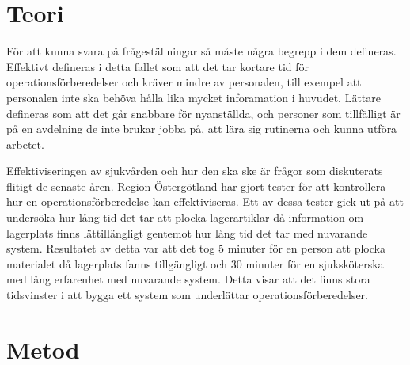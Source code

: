 \documentclass{article}
\begin{document}
\section{Teori}
För att kunna svara på frågeställningar så måste några begrepp i dem defineras.
Effektivt defineras i detta fallet som att det tar kortare tid för operationsförberedelser och kräver mindre av personalen, till exempel att personalen inte ska behöva hålla lika mycket inforamation i huvudet. 
Lättare defineras som att det går snabbare för nyanställda, och personer som tillfälligt är på en avdelning de inte brukar jobba på, att lära sig rutinerna och kunna utföra arbetet.

Effektiviseringen av sjukvården och hur den ska ske är frågor som diskuterats flitigt de senaste åren. Region Östergötland har gjort tester för att kontrollera hur en operationsförberedelse kan effektiviseras. Ett av dessa tester gick ut på att undersöka hur lång tid det tar att plocka lagerartiklar då information om lagerplats finns lättillängligt gentemot hur lång tid det tar med nuvarande system. Resultatet av detta var att det tog 5 minuter för en person att plocka materialet då lagerplats fanns tillgängligt och 30 minuter för en sjuksköterska med lång erfarenhet med nuvarande system. Detta visar att det finns stora tidsvinster i att bygga ett system som underlättar operationsförberedelser.



 
\section{Metod}
\end{document}
